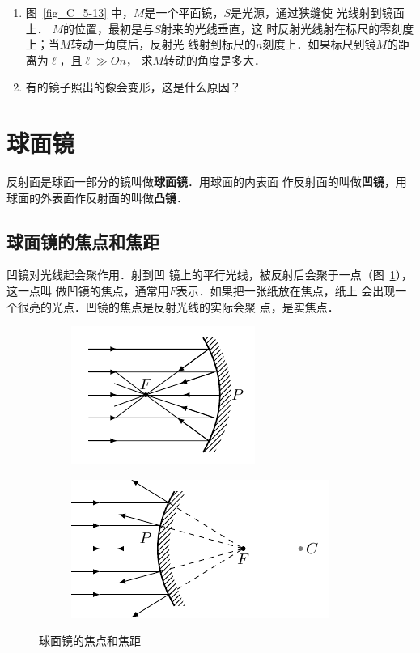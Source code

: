 \begin{enumerate}
    \item 图~\ref{fig_C_5-13} 中，$M$是一个平面镜，$S$是光源，通过狭缝使
    光线射到镜面上．
    $M$的位置，最初是与$S$射来的光线垂直，这
    时反射光线射在标尺的零刻度上；当$M$转动一角度后，反射光
    线射到标尺的$n$刻度上．如果标尺到镜$M$的距离为$\ell$，且$\ell\gg On$，
    求$M$转动的角度是多大．
    \item 有的镜子照出的像会变形，这是什么原因？
    
\end{enumerate}
    
\section{球面镜}
反射面是球面一部分的镜叫做\textbf{球面镜}．用球面的内表面
作反射面的叫做\textbf{凹镜}，用球面的外表面作反射面的叫做\textbf{凸镜}．

\subsection{球面镜的焦点和焦距}

凹镜对光线起会聚作用．射到凹
镜上的平行光线，被反射后会聚于一点（图~\ref{fig_C_5-14a}），这一点叫
做凹镜的焦点，通常用$F$表示．如果把一张纸放在焦点，纸上
会出现一个很亮的光点．凹镜的焦点是反射光线的实际会聚
点，是实焦点．
\begin{figure}[htbp]
    \centering
    \begin{subfigure}{0.4\linewidth}
        \centering
        \includegraphics{fig/C/5-14a.pdf}
        \caption{}\label{fig_C_5-14a}
    \end{subfigure}
    \hfil
    \begin{subfigure}{0.4\linewidth}
        \centering
        \includegraphics{fig/C/5-14b.pdf}
        \caption{}\label{fig_C_5-14b}
    \end{subfigure}
    \caption{球面镜的焦点和焦距}\label{fig_C_5-14}
\end{figure}


